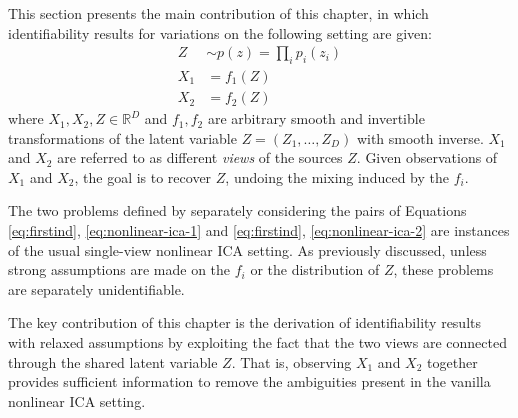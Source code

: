 This section presents the main contribution of this chapter, in which identifiability results for variations on the following setting are given:
\begin{align}
Z &\sim p(z) = \prod_{i} p_i(z_i) \label{eq:firstind}\\
X_1 &= f_1(Z) \label{eq:nonlinear-ica-1}\\
X_2 &= f_2(Z) \label{eq:nonlinear-ica-2}
\end{align}
where $X_1, X_2, Z \in \mathbb{R}^D$ and $f_1, f_2$ are arbitrary smooth and invertible transformations of the latent variable $Z = (Z_1, \ldots, Z_D)$ with smooth inverse.
$X_1$ and $X_2$ are referred to as different \emph{views} of the sources $Z$.
Given observations of $X_1$ and $X_2$, the goal is to recover $Z$, undoing the mixing induced by the $f_i$.

The two problems defined by separately considering the pairs of Equations \ref{eq:firstind}, \ref{eq:nonlinear-ica-1} and \ref{eq:firstind}, \ref{eq:nonlinear-ica-2} are instances of the usual single-view nonlinear ICA setting.
As previously discussed, unless strong assumptions are made on the $f_i$ or the distribution of $Z$, these problems are separately unidentifiable. 

The key contribution of this chapter is 
the derivation of
identifiability results 
with relaxed assumptions by exploiting the fact that the 
two views are connected through the shared latent variable $Z$. 
That is, observing $X_1$ and $X_2$ together provides sufficient information to remove the ambiguities present in the vanilla nonlinear ICA setting.



